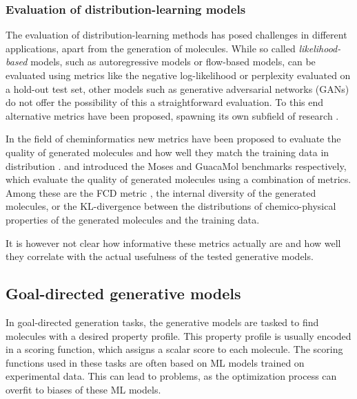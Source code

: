 \subsubsection{Evaluation of distribution-learning models}
The evaluation of distribution-learning methods has posed challenges in
different applications, apart from the generation of molecules. While so called
\emph{likelihood-based} models, such as autoregressive models or flow-based
models, can be evaluated using metrics like the negative log-likelihood or
perplexity evaluated on a hold-out test set, other models such as generative
adversarial networks (GANs) \citep{goodfellowGenerativeAdversarialNetworks2014}
do not offer the possibility of this a straightforward evaluation. To this end
alternative metrics have been proposed, spawning its own subfield of research
\citep{heuselGANsTrainedTwo2017}.

In the field of cheminformatics new metrics have been proposed to evaluate the
quality of generated molecules and how well they match the training data in
distribution \citep{preuerFrechetChemNetDistance2018}.
\citet{polykovskiyMolecularSetsMOSES2020} and
\citet{brownGuacaMolBenchmarkingModels2019} introduced the Moses and GuacaMol
benchmarks respectively, which evaluate the quality of generated molecules using
a combination of metrics. Among these are the FCD metric
\citep{preuerFrechetChemNetDistance2018}, the internal diversity
\citep{benhendaChemGANChallengeDrug2017} of the generated molecules, or the
KL-divergence between the distributions of chemico-physical properties of the
generated molecules and the training data.

It is however not clear how informative these metrics actually are and how well
they correlate with the actual usefulness of the tested generative models.

\subsection{Goal-directed generative models\label{sec:eval-gen}}

In goal-directed generation tasks, the generative models are tasked to find
molecules with a desired property profile. This property profile is usually 
encoded in a scoring function, which assigns a scalar score to each molecule. 
The scoring functions used in these tasks are often based on ML models trained on experimental
data. This can lead to problems, as the optimization process can overfit to
biases of these ML models. 

